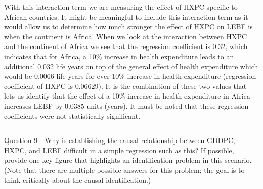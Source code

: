 \documentclass[
]{article}
\begin{document}
With this interaction term we are measuring the effect of HXPC specific
to African countries. It might be meaningful to include this interaction
term as it would allow us to determine how much stronger the effect of
HXPC on LEBF is when the continent is Africa. When we look at the
interaction between HXPC and the continent of Africa we see that the
regression coefficient is 0.32, which indicates that for Africa, a 10\%
increase in health expenditure leads to an additional 0.032 life years
on top of the general effect of health expenditure which would be 0.0066
life years for ever 10\% increase in health expenditure (regression
coefficient of HXPC is 0.06629). It is the combination of these two
values that lets us identify that the effect of a 10\% increase in
health expenditure in Africa increases LEBF by 0.0385 units (years). It
must be noted that these regression coefficients were not statistically
significant.

\begin{center}\rule{0.5\linewidth}{0.5pt}\end{center}

Question 9 - Why is establishing the causal relationship between GDDPC,
HXPC, and LEBF difficult in a simple regression such as this? If
possible, provide one key figure that highlights an identification
problem in this scenario. (Note that there are multiple possible answers
for this problem; the goal is to think critically about the causal
identification.)
\end{document}
